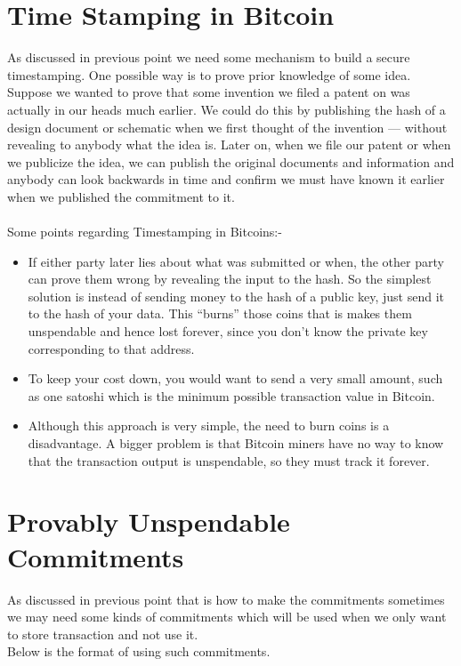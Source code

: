 \documentclass[10pt,a4paper]{article}
\begin{document}
\section{Time Stamping in Bitcoin}
As discussed in previous point we need some mechanism to build a secure timestamping. One possible way is to prove prior knowledge of some idea. Suppose we wanted to prove that some invention we filed a patent on was actually in our heads much earlier. We could do this by publishing the hash of a design document or schematic when we first thought of the invention — without revealing to anybody what the idea is. Later on, when we file our patent or when we publicize the idea, we can publish the original documents and information and anybody can look backwards in time and confirm we must have known it earlier when we published the commitment to it.
\\
\\
Some points regarding Timestamping in Bitcoins:-
\begin{itemize}
    \item If either party later lies about what was submitted or when, the other party can prove them wrong by revealing the input to the hash. So the simplest solution is instead of sending money to the hash of a public key, just send it to the hash of your data. This “burns” those coins that is makes them unspendable and hence lost forever, since you don’t know the private key corresponding to that address. 

    \item To keep your cost down, you would want to send a very small amount, such as one satoshi which is the minimum possible transaction value in Bitcoin.

    \item Although this approach is very simple, the need to burn coins is a disadvantage. A bigger problem is that Bitcoin miners have no way to know that the transaction output is unspendable, so they must track it forever.
\end{itemize}

\section{Provably Unspendable Commitments}
As discussed in previous point that is how to make the commitments sometimes we may need some kinds of commitments which will be used when we only want to store transaction and not use it.
\\
Below is the format of using such commitments.
\end{document}
